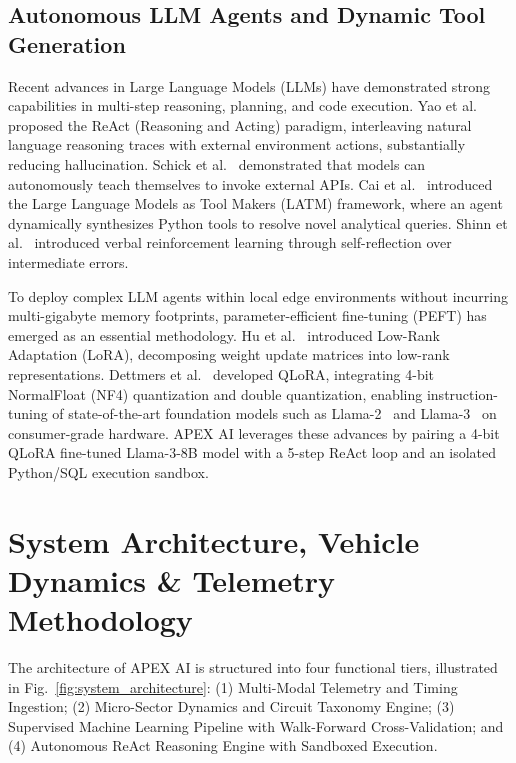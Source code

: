\documentclass[journal]{IEEEtran}
\begin{document}
\subsection{Autonomous LLM Agents and Dynamic Tool Generation}
Recent advances in Large Language Models (LLMs) have demonstrated strong capabilities in multi-step reasoning, planning, and code execution. Yao et al.~\cite{yao2022react} proposed the ReAct (Reasoning and Acting) paradigm, interleaving natural language reasoning traces with external environment actions, substantially reducing hallucination. Schick et al.~\cite{schick2023toolformer} demonstrated that models can autonomously teach themselves to invoke external APIs. Cai et al.~\cite{cai2023latm} introduced the Large Language Models as Tool Makers (LATM) framework, where an agent dynamically synthesizes Python tools to resolve novel analytical queries. Shinn et al.~\cite{shinn2023reflexion} introduced verbal reinforcement learning through self-reflection over intermediate errors.

To deploy complex LLM agents within local edge environments without incurring multi-gigabyte memory footprints, parameter-efficient fine-tuning (PEFT) has emerged as an essential methodology. Hu et al.~\cite{hu2022lora} introduced Low-Rank Adaptation (LoRA), decomposing weight update matrices into low-rank representations. Dettmers et al.~\cite{dettmers2022llmint8, dettmers2023qlora} developed QLoRA, integrating 4-bit NormalFloat (NF4) quantization and double quantization, enabling instruction-tuning of state-of-the-art foundation models such as Llama-2~\cite{touvron2023llama2} and Llama-3~\cite{dubey2024llama3} on consumer-grade hardware. APEX AI leverages these advances by pairing a 4-bit QLoRA fine-tuned Llama-3-8B model with a 5-step ReAct loop and an isolated Python/SQL execution sandbox.

\section{System Architecture, Vehicle Dynamics \& Telemetry Methodology}
\label{sec:architecture}
The architecture of APEX AI is structured into four functional tiers, illustrated in Fig.~\ref{fig:system_architecture}: (1) Multi-Modal Telemetry and Timing Ingestion; (2) Micro-Sector Dynamics and Circuit Taxonomy Engine; (3) Supervised Machine Learning Pipeline with Walk-Forward Cross-Validation; and (4) Autonomous ReAct Reasoning Engine with Sandboxed Execution.
\end{document}
